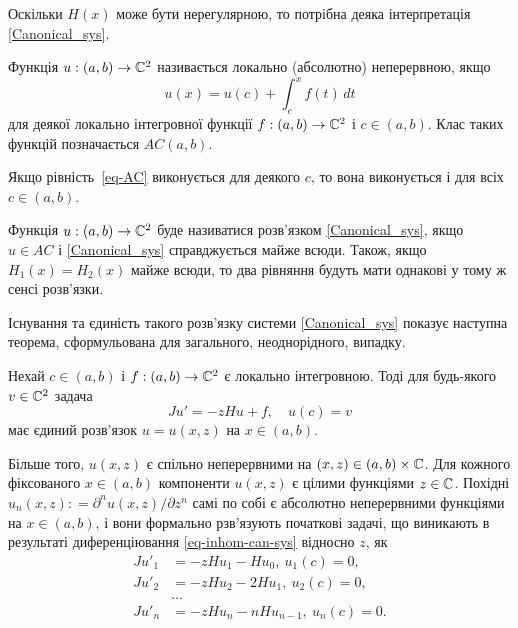 Оскільки $H(x)$ може бути нерегулярною, то потрібна деяка інтерпретація \eqref{Canonical_sys}.

\begin{definition}
	Функція $u:(a,b)\to \mathbb{C}^2$ називається локально (абсолютно) неперервною, якщо
	\begin{equation} \label{eq-AC}
	 	u(x) = u(c) + \int_c^x{f(t)\,dt}
	\end{equation}
	для деякої локально інтегровної функції $f:(a,b)\to \mathbb{C}^2$ і $c\in(a,b)$. Клас таких функцій позначається $AC(a,b)$.
\end{definition}

Якщо рівність~\eqref{eq-AC} виконується для деякого $c$, то вона виконується і для всіх $c\in(a,b)$.

Функція $u:(a,b)\to\mathbb{C}^2$ буде називатися розв'язком \eqref{Canonical_sys}, якщо $u\in AC$ і \eqref{Canonical_sys} справджується майже всюди. Також, якщо $H_1(x) = H_2(x)$ майже всюди, то два рівняння будуть мати однакові у тому ж сенсі розв'язки.

Існування та єдиність такого розв'язку системи \eqref{Canonical_sys} показує наступна теорема, сформульована для загального, неоднорідного, випадку.

\begin{theorem}\label{Th-CS-1}
	Нехай $c\in(a,b)$ і $f:(a,b)\to \mathbb{C}^2$ є локально інтегровною. Тоді для будь-якого $v\in\mathbb{C}^2$ задача
	\begin{equation}\label{eq-inhom-can-sys}
		Ju'=-zHu+f,\quad u(c) = v
	\end{equation}
	має єдиний розв'язок $u=u(x,z)$ на $x\in(a,b)$.

	Більше того, $u(x,z)$ є 
	спільно неперервними на $(x,z)\in (a,b)\times\mathbb{C}$. Для кожного фіксованого $x\in(a,b)$ компоненти $u(x,z)$ є цілими функціями $z\in\mathbb{C}$. Похідні $u_n(x, z): = \partial^n u(x,z)/\partial{z^n}$ самі по собі є абсолютно неперервними функціями на $x\in(a,b)$, і вони формально рзв'язують початкові задачі, що виникають в результаті диференціювання \eqref{eq-inhom-can-sys} відносно $z$, як
	\begin{align*}
		Ju'_1 &= -zHu_1 - Hu_0, \ u_1(c)=0,\\
		Ju'_2 &= -zHu_2 - 2Hu_1, \ u_2(c)=0,\\
		&\dots \\
		Ju'_n &= -zHu_n - nHu_{n-1}, \ u_n(c)=0.
	\end{align*}
\end{theorem}

